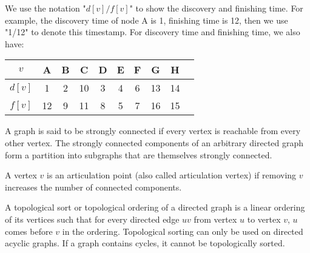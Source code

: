 \begin{eg}
\begin{figure}[H]
  \end{figure}
  We use the notation "\(d[v]/f[v]\)" to show the discovery and finishing time. For example, the discovery time of node A is 1, finishing time is 12, then we use "1/12" to denote this timestamp.
  For discovery time and finishing time, we also have:
  \begin{table}[H]
    \centering
    \begin{tabular}{c|c|c|c|c|c|c|c|c|c}
      \(v\)  & A & B & C & D & E & F & G & H \\
      \midrule
      \(d[v]\) & 1 & 2 & 10 & 3 & 4 & 6 & 13 & 14 \\
      \midrule
      \(f[v]\) & 12 & 9 & 11 & 8 & 5 & 7 & 16 & 15 \\
    \end{tabular}
  \end{table}
\end{eg}

A graph is said to be strongly connected if every vertex is reachable from every other vertex. The strongly connected components of an arbitrary directed graph form a partition into subgraphs that are themselves strongly connected.

A vertex \(v\) is an articulation point (also called articulation vertex) if removing \(v\) increases the number of connected components.

A topological sort or topological ordering of a directed graph is a linear ordering of its vertices such that for every directed edge \(uv\) from vertex \(u\) to vertex \(v\), \(u\) comes before \(v\) in the ordering. Topological sorting can only be used on directed acyclic graphs. If a graph contains cycles, it cannot be topologically sorted.

